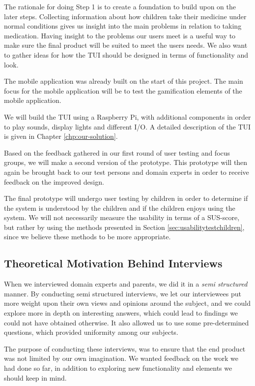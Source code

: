 The rationale for doing Step 1 is to create a foundation to build upon on the later steps. 
Collecting information about how children take their medicine under normal conditions gives us insight into the main problems in relation to taking medication. Having insight to the problems our users meet is a useful way to make sure the final product will be suited to meet the users needs. We also want to gather ideas for how the TUI should be designed in terms of functionality and look.

The mobile application was already built on the start of this project. The main focus for the mobile application will be to test the gamification elements of the mobile application. 

We will build the TUI using a Raspberry Pi, with additional components in order to play sounds, display lights and different I/O. A detailed description of the TUI is given in Chapter \ref{chp:our-solution}. 


Based on the feedback gathered in our first round of user testing and focus groups, we will make a second version of the prototype. This prototype will then again be brought back to our test persons and domain experts in order to receive feedback on the improved design.

The final prototype will undergo user testing by children in order to determine if the system is understood by the children and if the children enjoys using the system. We will not necessarily measure the usability in terms of a SUS-score\cite{brooke1996sus}, but rather by using the methods presented in Section \ref{sec:usabilitytestchildren}, since we believe these methods to be more appropriate.

\subsection{Theoretical Motivation Behind Interviews}

When we interviewed domain experts and parents, we did it in a \emph{semi structured} manner. By conducting semi structured interviews, we let our interviewees put more weight upon their own views and opinions around the subject, and we could explore more in depth on interesting answers, which could lead to findings we could not have obtained otherwise. It also allowed us to use some pre-determined questions, which provided uniformity among our subjects.

The purpose of conducting these interviews, was to ensure that the end product was not limited by our own imagination. We wanted feedback on the work we had done so far, in addition to exploring new functionality and elements we should keep in mind. 

